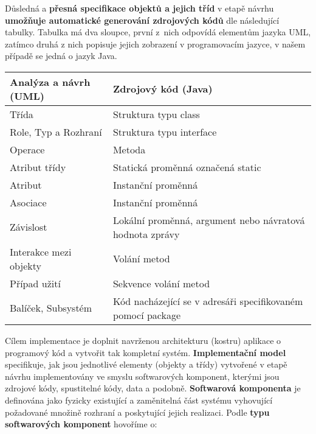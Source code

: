 Důsledná a \textbf{přesná specifikace objektů a jejich tříd} v etapě návrhu \textbf{umožňuje automatické generování zdrojových kódů} dle následující tabulky. Tabulka má dva sloupce, první z nich odpovídá elementům jazyka UML, zatímco druhá z nich popisuje jejich zobrazení v programovacím jazyce, v našem případě se jedná o jazyk Java.

\begin{table}[H]
	\centering
	\begin{tabular}{|l|l|}
		\hline
		\textbf{Analýza a návrh (UML)} & \textbf{Zdrojový kód (Java)}                                \\ \hline
		Třída                          & Struktura typu class                                        \\ \hline
		Role, Typ a Rozhraní           & Struktura typu interface                                    \\ \hline
		Operace                        & Metoda                                                      \\ \hline
		Atribut třídy                  & Statická proměnná označená static                           \\ \hline
		Atribut                        & Instanční proměnná                                          \\ \hline
		Asociace                       & Instanční proměnná                                          \\ \hline
		Závislost                      & Lokální proměnná, argument nebo návratová hodnota zprávy    \\ \hline
		Interakce mezi objekty         & Volání metod                                                \\ \hline
		Případ užití                   & Sekvence volání metod                                       \\ \hline
		Balíček, Subsystém             & Kód nacházející se v adresáři specifikovaném pomocí package \\ \hline
	\end{tabular}
\end{table}

Cílem implementace je doplnit navrženou architekturu (kostru) aplikace o programový kód a vytvořit tak kompletní systém. \textbf{Implementační model }specifikuje, jak jsou jednotlivé elementy (objekty a třídy) vytvořené v etapě návrhu{ implementovány ve smyslu softwarových komponent}, kterými jsou zdrojové kódy, spustitelné kódy, data a podobně. \textbf{Softwarová komponenta} je definována jako fyzicky existující a zaměnitelná část systému vyhovující požadované množině rozhraní a poskytující jejich realizaci. Podle \textbf{typu softwarových komponent} hovoříme o:

